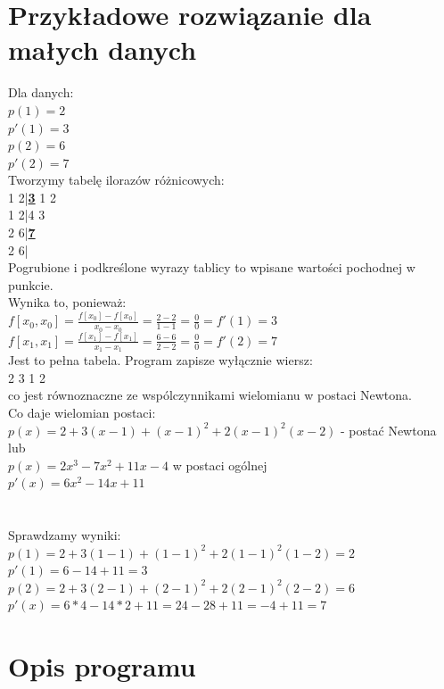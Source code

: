 \documentclass[16pt]{article} %
\begin{document}
\section{Przykładowe rozwiązanie dla małych danych}
Dla danych:\\
$p(1)=2$\\ $p'(1)=3$\\ $p(2)=6$\\ $p'(2)=7$\\
Tworzymy tabelę ilorazów różnicowych:\\
1 2|\textbf{\underline{3}} 1 2\\
1 2|4 3\\
2 6|\textbf{\underline{7}}\\
2 6|\\
Pogrubione i podkreślone wyrazy tablicy to wpisane wartości pochodnej w punkcie.\\
Wynika to, ponieważ:\\
$f[x_0,x_0]=\frac{f[x_0]-f[x_0]}{x_0-x_0} = \frac{2-2}{1-1} = \frac {0}{0} = f'(1) = 3$\\
$f[x_1,x_1]=\frac{f[x_1]-f[x_1]}{x_1-x_1} = \frac{6-6}{2-2} = \frac {0}{0} = f'(2) = 7$\\

Jest to pełna tabela. Program zapisze wyłącznie wiersz: \\
2 3 1 2 \\
co jest równoznaczne ze wspólczynnikami wielomianu w postaci Newtona.\\
Co daje wielomian postaci:\\
$p(x) = 2 + 3(x-1) + (x-1)^2 + 2(x-1)^{2}(x-2) $ - postać Newtona  \\
lub\\ $p(x) = 2x^3 - 7x^2 +11x -4$ w postaci ogólnej\\
$p'(x) = 6x^2 -14x +11$ \\\\\\
Sprawdzamy wyniki: \\
$p(1) = 2 + 3(1-1) + (1-1)^2 + 2(1-1)^{2}(1-2) = 2$\\
$p'(1) = 6-14+11=3$\\
$p(2) = 2 + 3(2-1) + (2-1)^2 + 2(2-1)^{2}(2-2) = 6$\\
$p'(x) = 6*4-14*2+11=24-28+11=-4+11=7$\\
\section{Opis programu}
\end{document}
